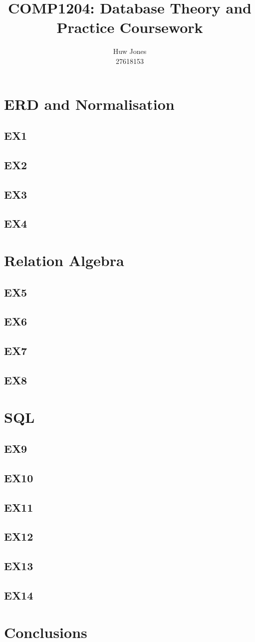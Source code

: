 \documentclass[a4paper]{article}
\author{Huw Jones \\27618153}
\title{COMP1204: Database Theory and Practice Coursework}
\begin{document}
\maketitle
\newpage

\section{ERD and Normalisation}
\subsection{EX1}

\subsection{EX2}
\subsection{EX3}
\subsection{EX4}

\section{Relation Algebra}
\subsection{EX5}
\subsection{EX6}
\subsection{EX7}
\subsection{EX8}

\section{SQL}
\subsection{EX9}
\subsection{EX10}
\subsection{EX11}
\subsection{EX12}
\subsection{EX13}
\subsection{EX14}

\section{Conclusions}
\end{document}
